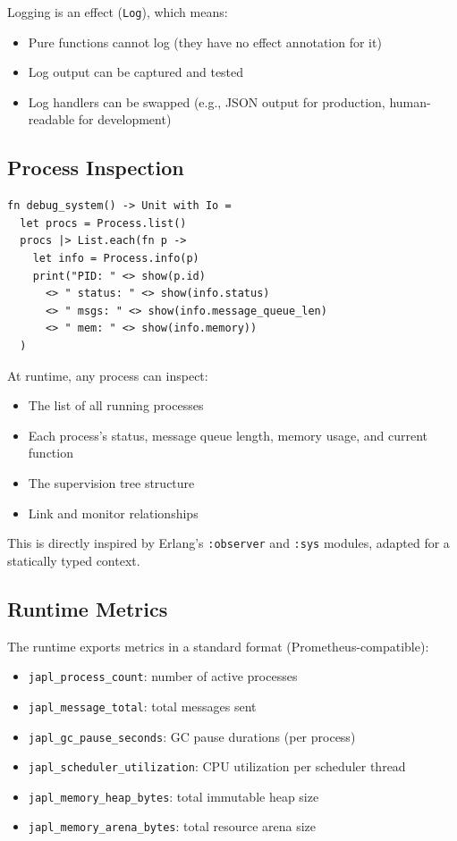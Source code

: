 \documentclass[11pt,twocolumn]{article}
\begin{document}
Logging is an effect (\texttt{Log}), which means:
\begin{itemize}[leftmargin=*]
\item Pure functions cannot log (they have no effect annotation for it)
\item Log output can be captured and tested
\item Log handlers can be swapped (e.g., JSON output for production, human-readable for development)
\end{itemize}

\subsection{Process Inspection}

\begin{lstlisting}
fn debug_system() -> Unit with Io =
  let procs = Process.list()
  procs |> List.each(fn p ->
    let info = Process.info(p)
    print("PID: " <> show(p.id)
      <> " status: " <> show(info.status)
      <> " msgs: " <> show(info.message_queue_len)
      <> " mem: " <> show(info.memory))
  )
\end{lstlisting}

At runtime, any process can inspect:
\begin{itemize}[leftmargin=*]
\item The list of all running processes
\item Each process's status, message queue length, memory usage, and current function
\item The supervision tree structure
\item Link and monitor relationships
\end{itemize}

This is directly inspired by Erlang's \texttt{:observer} and \texttt{:sys} modules, adapted for a statically typed context.

\subsection{Runtime Metrics}

The runtime exports metrics in a standard format (Prometheus-compatible):
\begin{itemize}[leftmargin=*]
\item \texttt{japl\_process\_count}: number of active processes
\item \texttt{japl\_message\_total}: total messages sent
\item \texttt{japl\_gc\_pause\_seconds}: GC pause durations (per process)
\item \texttt{japl\_scheduler\_utilization}: CPU utilization per scheduler thread
\item \texttt{japl\_memory\_heap\_bytes}: total immutable heap size
\item \texttt{japl\_memory\_arena\_bytes}: total resource arena size
\end{itemize}
\end{document}
